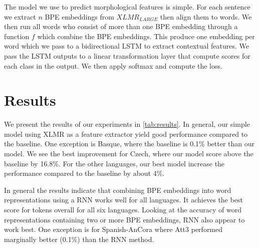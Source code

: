 \documentclass[11pt]{article}
\begin{document}
	The model we use to predict morphological features is simple. For each sentence we extract $n$ BPE embeddings from $XLMR_{LARGE}$ then align them to words. 
	We then run all words who consist of more than one BPE embedding through a function $f$ which combine the BPE embeddings. This produce one embedding per word which we pass to a bidirectional LSTM to extract contextual features. 
	We pass the LSTM outputs to a linear transformation layer that compute scores for each class in the output. We then apply softmax and compute the loss.

	
	\section{Results}
	\label{results}
	
	We present the results of our experiments in \cref{tab:results}. In general, our simple model using XLMR as a feature extractor yield good performance compared to the baseline. One exception is Basque, where the baseline is 0.1\% better than our model. 
	We see the best improvement for Czech, where our model score above the baseline by 16.8\%. For the other languages, our best model increase the performance compared to the baseline by about 4\%.  
	
	In general the results indicate that combining BPE embeddings into word representations using a RNN works well for all languages. It achieves the best score for tokens overall for all six languages. 
	Looking at the accuracy of word representations containing two or more BPE embeddings, RNN also appear to work best. One exception is for Spanish-AnCora where Att3 performed marginally better (0.1\%) than the RNN method.
	
\end{document}
